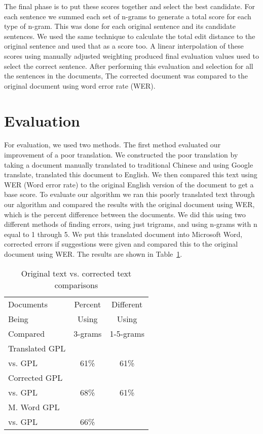 \documentclass[twocolumn]{article}
\begin{document}
The final phase is to put these scores together and select the best candidate. For each sentence we summed each set of n-grams to generate a total score for each type of n-gram. This was done for each original sentence and its candidate sentences. We used the same technique to calculate the total edit distance to the original sentence and used that as a score too. A linear interpolation of these scores using manually adjusted weighting produced final evaluation values used to select the correct sentence. After performing this evaluation and selection for all the sentences in the documents, The corrected document was compared to the original document using word error rate (WER).

\section{Evaluation}
For evaluation, we used two methods. The first method evaluated our improvement of a poor translation. We constructed the poor translation by taking a document manually translated to traditional Chinese and using Google translate, translated this document to English. We then compared this text using WER (Word error rate) to the original English version of the document to get a base score. To evaluate our algorithm we ran this poorly translated text through our algorithm and compared the results with the original document using WER, which is the percent difference between the documents. We did this using two different methods of finding errors, using just trigrams, and using n-grams with n equal to 1 through 5. We put this translated document into Microsoft Word, corrected errors if suggestions were given and compared this to the original document using WER. The results are shown in Table~\ref{gpl}.

\begin{table}[h]
\centering
\begin{tabular}{ | l | c  c | }
\hline
Documents & Percent & Different \\
\cline{2-3} Being & Using & \multicolumn{1}{|c|}{Using} \\
Compared & 3-grams & \multicolumn{1}{|c|}{1-5-grams} \\
\hline
Translated GPL & & \multicolumn{1}{|c|}{} \\
vs. GPL & 61\% & \multicolumn{1}{|c|}{61\%} \\
\hline
Corrected GPL & & \multicolumn{1}{|c|}{} \\
vs. GPL & 68\% & \multicolumn{1}{|c|}{61\%} \\
\hline
M. Word GPL & & \multicolumn{1}{c|}{} \\
vs. GPL & {66\%} & \multicolumn{1}{c|}{} \\
\hline
\end{tabular}
\caption{Original text vs. corrected text comparisons}
\label{gpl}
\end{table}
\end{document}
